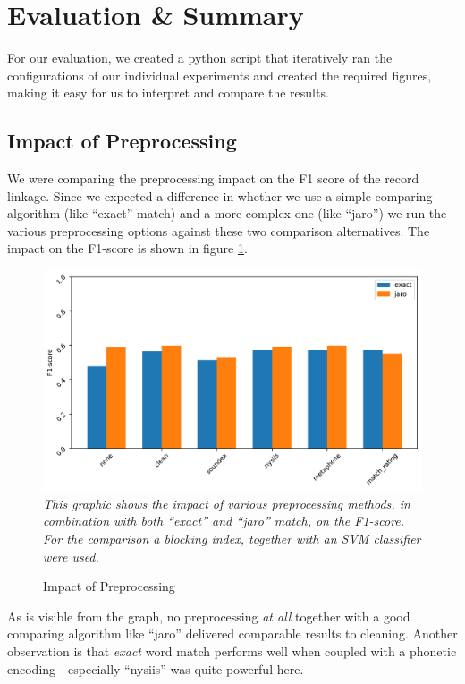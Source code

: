 \documentclass[sigconf,nonacm]{acmart}
\begin{document}
\section{Evaluation \& Summary}

For our evaluation, we created a python script that iteratively
ran the configurations of our individual experiments and created
the required figures, making it easy for us to interpret and
compare the results.

\subsection{Impact of Preprocessing}

We were comparing the preprocessing impact on the F1 score of
the record linkage.
Since we expected a difference in whether we use a simple comparing
algorithm (like ``exact'' match) and a more complex one (like ``jaro'')
we run the various preprocessing options against these two comparison
alternatives.
The impact on the F1-score is shown in figure \ref{plot:preprocessing}.

\begin{figure}[h]
\centering
\caption{Impact of Preprocessing}
\label{plot:preprocessing}
\includegraphics[width=0.9\linewidth]{../figures/eval_preprocessing}\\[-2mm]
\emph{\small
This graphic shows the impact of various preprocessing methods, in combination with both ``exact'' and ``jaro'' match, on the F1-score.
For the comparison a blocking index, together with an SVM classifier were used.}
\end{figure}

As is visible from the graph, no preprocessing \emph{at all} together
with a good comparing algorithm like ``jaro'' delivered comparable results
to cleaning.
Another observation is that \emph{exact} word match performs well when coupled
with a phonetic encoding - especially ``nysiis'' was quite powerful here.
\end{document}
